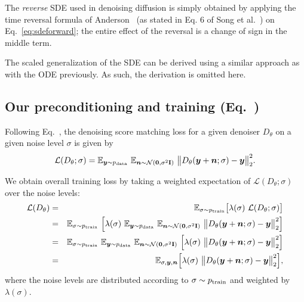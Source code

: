 The \emph{reverse} SDE used in denoising diffusion is simply obtained by applying the time reversal formula of Anderson~\cite{Anderson1982} (as stated in Eq. 6 of Song et al.~\cite{Song2021sde}) on Eq.~\ref{eq:sdeforward}; the entire effect of the reversal is a change of sign in the middle term. 

The scaled generalization of the SDE can be derived using a similar approach as with the ODE previously.
As such, the derivation is omitted here.

\subsection{Our preconditioning and training (Eq.~)}
\label{app:ourprecond}

Following Eq.~, the denoising score matching loss for a given denoiser $D_\theta$ on a given noise level $\sigma$ is given by
\begin{equation}
  \mathcal{L}(D_\theta; \sigma) = \mathbb{E}_{\boldsymbol{y} \sim p_\text{data}} ~\mathbb{E}_{\boldsymbol{n} \sim \mathcal{N}(\mathbf{0}, \sigma^2 \mathbf{I})} ~\big\lVert D_\theta(\boldsymbol{y} + \boldsymbol{n}; \sigma) - \boldsymbol{y} \big\rVert^2_2
  \text{.}
\end{equation}

We obtain overall training loss by taking a weighted expectation of $\mathcal{L}(D_\theta; \sigma)$ over the noise levels:
\begin{eqnarray}
  \mathcal{L}(D_\theta) &=& \mathbb{E}_{\sigma \sim p_\text{train}} \big[ \lambda(\sigma) ~\mathcal{L}(D_\theta; \sigma) \big] \\
  &=& \mathbb{E}_{\sigma \sim p_\text{train}} ~\Big[ \lambda(\sigma) ~\mathbb{E}_{\boldsymbol{y} \sim p_\text{data}} ~\mathbb{E}_{\boldsymbol{n} \sim \mathcal{N}(\mathbf{0}, \sigma^2 \mathbf{I})} ~\big\lVert D_\theta(\boldsymbol{y} + \boldsymbol{n}; \sigma) - \boldsymbol{y} \big\rVert^2_2 \Big] \\
  &=& \mathbb{E}_{\sigma \sim p_\text{train}} ~\mathbb{E}_{\boldsymbol{y} \sim p_\text{data}} ~\mathbb{E}_{\boldsymbol{n} \sim \mathcal{N}(\mathbf{0}, \sigma^2 \mathbf{I})}  ~\Big[ \lambda(\sigma) ~\big\lVert D_\theta(\boldsymbol{y} + \boldsymbol{n}; \sigma) - \boldsymbol{y} \big\rVert^2_2 \Big] \\
  &=& \mathbb{E}_{\sigma, \boldsymbol{y}, \boldsymbol{n}} \Big[ \lambda(\sigma) ~\big\lVert D_\theta(\boldsymbol{y} + \boldsymbol{n}; \sigma) - \boldsymbol{y} \big\rVert^2_2 \Big]
  \label{eq:totalloss}
  \text{,}
\end{eqnarray}
where the noise levels are distributed according to $\sigma \sim p_\text{train}$ and weighted by $\lambda(\sigma)$.

